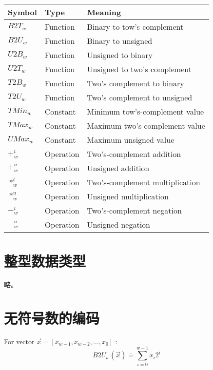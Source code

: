 \begin{table}[!ht]
    \centering
    \begin{tabular}{lll}
        \toprule
        Symbol & Type & Meaning \\
        \midrule
        $B2T_w$  & Function  & Binary to tow's complement \\
        $B2U_w$  & Function  & Binary to unsigned \\
        $U2B_w$  & Function  & Unsigned to binary \\
        $U2T_w$  & Function  & Unsigned to two's complement \\
        $T2B_w$  & Function  & Two's complement to binary \\
        $T2U_w$  & Function  & Two's complement to unsigned \\
        $TMin_w$ & Constant  & Minimum tow's-complement value \\
        $TMax_w$ & Constant  & Maximum two's-complement value \\
        $UMax_w$ & Constant  & Maximum unsigned value \\
        $+^t_w$  & Operation & Two's-complement addition \\
        $+^u_w$  & Operation & Unsigned addition \\
        $*^t_w$  & Operation & Two's-complement multiplication \\
        $*^u_w$  & Operation & Unsigned multiplication \\
        $-^t_w$  & Operation & Two's-complement negation \\
        $-^u_w$  & Operation & Unsigned negation \\
        \bottomrule
    \end{tabular}
\end{table}

\section{整型数据类型}

略。

\section{无符号数的编码}

\begin{definition}
    For vector $\vec{x} = [x_{w-1}, x_{w-2}, \dots, x_0]$ :
    \begin{equation}
        B2U_w(\vec{x}) \doteq \sum\limits_{i=0}^{w-1} x_i 2^i
        \label{def:b2u}
    \end{equation}
\end{definition}

